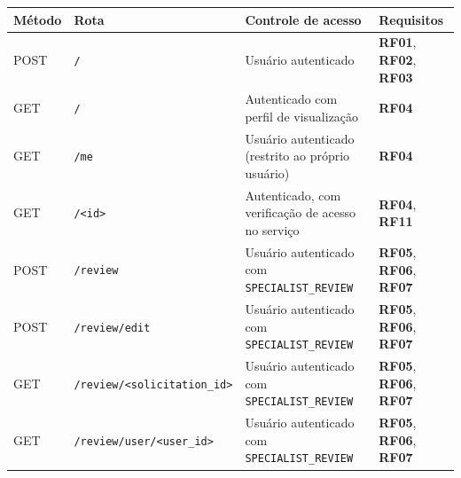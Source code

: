 \begin{quadro}[htbp]
\centering
\caption[Endpoints do módulo de solicitações e revisão]
{Endpoints implementados nos módulos de solicitações e revisão.}
\label{qua:endpoints}

\scriptsize
\setlength{\tabcolsep}{4pt}
\renewcommand{\arraystretch}{1.3}

\begin{tabularx}{\linewidth}{
    @{}
    >{\raggedright\arraybackslash}p{1.1cm}
    >{\raggedright\arraybackslash}p{3.9cm}
    >{\raggedright\arraybackslash}X
    >{\raggedright\arraybackslash}p{1.8cm}
    @{}
}
\toprule
\textbf{Método} &
\textbf{Rota} &
\textbf{Controle de acesso} &
\textbf{Requisitos} \\
\midrule

POST & \texttt{/} &
Usuário autenticado &
\textbf{RF01}, \textbf{RF02}, \textbf{RF03} \\
\midrule

GET & \texttt{/} &
Autenticado com perfil de visualização &
\textbf{RF04} \\
\midrule

GET & \texttt{/me} &
Usuário autenticado (restrito ao próprio usuário) &
\textbf{RF04} \\
\midrule

GET & \texttt{/\textless id\textgreater} &
Autenticado, com verificação de acesso no serviço &
\textbf{RF04}, \textbf{RF11} \\
\midrule

POST & \texttt{/review} &
Usuário autenticado com \texttt{SPECIALIST\_REVIEW} &
\textbf{RF05}, \textbf{RF06}, \textbf{RF07} \\
\midrule

POST & \texttt{/review/edit} &
Usuário autenticado com \texttt{SPECIALIST\_REVIEW} &
\textbf{RF05}, \textbf{RF06}, \textbf{RF07} \\
\midrule

GET & \texttt{/review/\textless solicitation\_id\textgreater} &
Usuário autenticado com \texttt{SPECIALIST\_REVIEW} &
\textbf{RF05}, \textbf{RF06}, \textbf{RF07} \\
\midrule

GET & \texttt{/review/user/\textless user\_id\textgreater} &
Usuário autenticado com \texttt{SPECIALIST\_REVIEW} &
\textbf{RF05}, \textbf{RF06}, \textbf{RF07} \\

\bottomrule
\end{tabularx}

\end{quadro}


